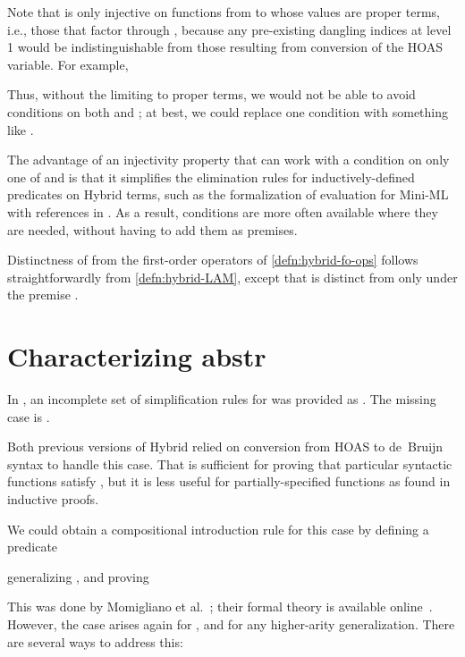 \documentclass[copyright,creativecommons]{eptcs}
\begin{document}
Note that  is only injective on functions from 
to  whose values are proper terms, i.e., those that factor through
, because any pre-existing dangling indices at level 1 would be
indistinguishable from those resulting from conversion of the HOAS variable.
For example,
  
Thus, without the  limiting  to proper terms,
we would not be able to avoid conditions on both  and ;
at best, we could replace one  condition
with something like .

The advantage of an injectivity property that can work with a condition on
only one of  and  is that it simplifies the elimination rules
for inductively-defined predicates on Hybrid terms, such as the formalization
of evaluation for Mini-ML with references in \cite[Sect.~5.3]{martin:2010a}.
As a result,  conditions are more often available where they are
needed, without having to add them as premises.

Distinctness of  from the first-order operators of
\autoref{defn:hybrid-fo-ops} follows straightforwardly from
\autoref{defn:hybrid-LAM}, except that  is distinct from
 only under the premise .


\section{Characterizing \ldquo abstr\rdquo}
\label{sec:hybrid-abstr2-and-abstr-LAM}

In , an incomplete set of simplification
rules for  was provided as .
The missing case is .

Both previous versions of Hybrid
\cite{ambler/crole/momigliano:2002,momigliano/martin/felty:2008}
relied on conversion from HOAS to de~Bruijn syntax to handle this case.
That is sufficient for proving that particular syntactic functions satisfy
,
but it is less useful for partially-specified functions as found in
inductive proofs.

We could obtain a compositional introduction rule for this case by defining
a predicate
  
generalizing , and proving
  
This was done by Momigliano et al.\ \cite{momigliano/ambler/crole:2002};
their formal theory  is available online~\cite{felty/momigliano:2010}.
However, the  case arises again for , and for any
higher-arity generalization.  There are several ways to address this:
\end{document}
